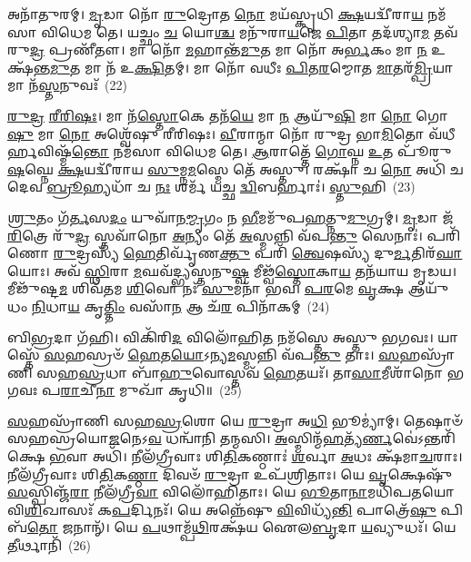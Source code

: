 𑌅𑌨𑌾᳴𑌤𑍁𑌰𑌮𑍍। \ul{𑌮𑍃}\-𑌡𑌾 𑌨𑍋᳴ \ul{𑌰𑍁}\-𑌦𑍍𑌰𑍋𑌤 \ul{𑌨𑍋} 𑌮𑌯᳴𑌸𑍍𑌕𑍃𑌧𑌿 \ul{𑌕𑍍𑌷}\-𑌯𑌦𑍍𑌵𑍀᳴𑌰𑌾\-\ul{𑌯} 𑌨𑌮᳴𑌸𑌾 𑌵𑌿𑌧𑍇𑌮 𑌤𑍇। 𑌯𑌚𑍍𑌛𑌂 \ul{𑌚} 𑌯𑍋\-\ul{𑌶𑍍𑌚} 𑌮𑌨𑍁᳴𑌰𑌾\-\ul{𑌯}\-𑌜𑍇 \ul{𑌪𑌿}\-𑌤𑌾 𑌤𑌦᳴𑌶𑍍𑌯𑌾\-\ul{𑌮} 𑌤𑌵᳴ 𑌰𑍁\-\ul{𑌦𑍍𑌰} 𑌪𑍍𑌰𑌣𑍀᳴𑌤𑍗। 𑌮𑌾 𑌨𑍋᳴ \ul{𑌮}\-𑌹𑌾𑌨𑍍𑌤᳴\-\ul{𑌮𑍁}\-𑌤 𑌮𑌾 𑌨𑍋᳴ 𑌅\-\ul{𑌰𑍍𑌭}\-𑌕𑌂 𑌮𑌾 \ul{𑌨} 𑌉𑌕𑍍𑌷᳴𑌨𑍍𑌤\-\ul{𑌮𑍁}\-𑌤 𑌮𑌾 𑌨᳴ 𑌉\-\ul{𑌕𑍍𑌷𑌿}\-𑌤𑌮𑍍। 𑌮𑌾 𑌨𑍋᳴ 𑌵𑌧𑍀𑌃 \ul{𑌪𑌿}\-𑌤\-\ul{𑌰}\-𑌮𑍍𑌮𑍋𑌤 \ul{𑌮𑌾}\-𑌤𑌰᳴\-\ul{𑌮𑍍𑌪𑍍𑌰𑌿}\-𑌯𑌾 𑌮𑌾 𑌨᳴\-\ul{𑌸𑍍𑌤}\-𑌨𑍁𑌵𑌃᳴~(22)

\-\ul{𑌰𑍁}\-\-\ul{𑌦𑍍𑌰} \ul{𑌰𑍀}\-\-\ul{𑌰𑌿}\-\-\ul{𑌷𑌃}\-। 𑌮𑌾 𑌨᳴\-\ul{𑌸𑍍𑌤𑍋}\-𑌕𑍇 𑌤𑌨᳴\-\ul{𑌯𑍇} 𑌮𑌾 \ul{𑌨} 𑌆𑌯𑍁᳴\-\ul{𑌷𑌿} 𑌮𑌾 \ul{𑌨𑍋} 𑌗𑍋\-\ul{𑌷𑍁} 𑌮𑌾 \ul{𑌨𑍋} 𑌅𑌶𑍍𑌵𑍇᳴𑌷𑍁 𑌰𑍀𑌰𑌿𑌷𑌃। \ul{𑌵𑍀}\-𑌰𑌾𑌨𑍍𑌮𑌾 𑌨𑍋᳴ 𑌰𑍁𑌦𑍍𑌰 𑌭𑌾\-\ul{𑌮𑌿}\-𑌤𑍋 𑌵᳴𑌧𑍀𑌰𑍍\mbox{}\-\ul{𑌹}\-𑌵𑌿𑌷𑍍𑌮᳴\-\ul{𑌨𑍍𑌤𑍋} 𑌨𑌮᳴𑌸𑌾 𑌵𑌿𑌧𑍇𑌮 𑌤𑍇। \ul{𑌆}\-𑌰𑌾𑌤𑍍𑌤𑍇᳴ \ul{𑌗𑍋}\-𑌘𑍍𑌨 \ul{𑌉}\-𑌤 𑌪𑍂᳴𑌰𑍁\-\ul{𑌷}\-𑌘𑍍𑌨𑍇 \ul{𑌕𑍍𑌷}\-𑌯𑌦𑍍𑌵𑍀᳴𑌰𑌾𑌯 \ul{𑌸𑍁}\-𑌮𑍍𑌨\-\ul{𑌮}\-𑌸𑍍𑌮𑍇 𑌤𑍇᳴ 𑌅𑌸𑍍𑌤𑍁। 𑌰𑌕𑍍𑌷𑌾᳴ 𑌚 \ul{𑌨𑍋} 𑌅𑌧𑌿᳴ 𑌚 𑌦𑍇𑌵 \ul{𑌬𑍍𑌰𑍂}\-𑌹𑍍𑌯𑌧𑌾᳴ 𑌚 \ul{𑌨𑌃} 𑌶𑌰𑍍𑌮᳴ 𑌯𑌚𑍍𑌛 \ul{𑌦𑍍𑌵𑌿}\-𑌬𑌰𑍍\mbox{}𑌹𑌾𑌃॑। \ul{𑌸𑍍𑌤𑍁}\-𑌹𑌿~(23)

\-\ul{𑌶𑍍𑌰𑍁}\-𑌤𑌂 𑌗᳴\-\ul{𑌰𑍍𑌤}\-𑌸\-\ul{𑌦𑌂} 𑌯𑍁𑌵𑌾᳴𑌨\-\ul{𑌮𑍍𑌮𑍃}\-𑌗𑌂 𑌨 \ul{𑌭𑍀}\-𑌮𑌮𑍁᳴𑌪\-\ul{𑌹}\-𑌤𑍍𑌨𑍁\-\ul{𑌮𑍁}\-𑌗𑍍𑌰𑌮𑍍। \ul{𑌮𑍃}\-𑌡𑌾 𑌜᳴\-\ul{𑌰𑌿}\-𑌤𑍍𑌰𑍇 𑌰𑍁᳴\-\ul{𑌦𑍍𑌰} 𑌸𑍍𑌤𑌵𑌾᳴𑌨𑍋 \ul{𑌅}\-𑌨𑍍𑌯𑌂 𑌤𑍇᳴ \ul{𑌅}\-𑌸𑍍𑌮𑌨𑍍𑌨𑌿 𑌵᳴𑌪\-\ul{𑌨𑍍𑌤𑍁} 𑌸𑍇𑌨𑌾𑌃॑। 𑌪𑌰𑌿᳴ 𑌣𑍋 \ul{𑌰𑍁}\-𑌦𑍍𑌰𑌸𑍍𑌯᳴ \ul{𑌹𑍇}\-𑌤𑌿𑌰𑍍𑌵𑍃᳴𑌣\-\ul{𑌕𑍍𑌤𑍁} 𑌪𑌰𑌿᳴ \ul{𑌤𑍍𑌵𑍇}\-𑌷𑌸𑍍𑌯᳴ 𑌦𑍁\-\ul{𑌰𑍍𑌮}\-𑌤𑌿𑌰᳴\-\ul{𑌘𑌾}\-𑌯𑍋𑌃। 𑌅𑌵᳴ \ul{𑌸𑍍𑌥𑌿}\-𑌰𑌾 \ul{𑌮}\-𑌘𑌵᳴𑌦𑍍𑌭𑍍𑌯𑌸𑍍𑌤𑌨𑍁\-\ul{𑌷𑍍𑌵} 𑌮𑍀𑌢𑍍𑌵᳴\-\ul{𑌸𑍍𑌤𑍋}\-𑌕𑌾\-\ul{𑌯} 𑌤𑌨᳴𑌯𑌾𑌯 𑌮𑍃𑌡𑌯। 𑌮𑍀𑌢𑍁᳴𑌷𑍍𑌟\-\ul{𑌮} 𑌶𑌿𑌵᳴𑌤𑌮 \ul{𑌶𑌿}\-𑌵𑍋 𑌨𑌃᳴ \ul{𑌸𑍁}\-𑌮𑌨𑌾᳴ 𑌭𑌵। \ul{𑌪}\-\-\ul{𑌰}\-𑌮𑍇 \ul{𑌵𑍃}\-𑌕𑍍𑌷 𑌆𑌯𑍁᳴𑌧𑌂 \ul{𑌨𑌿}\-𑌧𑌾\-\ul{𑌯} 𑌕𑍃\-\ul{𑌤𑍍𑌤𑌿𑌂} 𑌵𑌸𑌾᳴\-\ul{𑌨} 𑌆 𑌚᳴\-\ul{𑌰} 𑌪𑌿𑌨𑌾᳴𑌕𑌮𑍍~(24)

𑌬𑌿\-\ul{𑌭𑍍𑌰}\-𑌦𑌾 𑌗᳴𑌹𑌿। 𑌵𑌿𑌕𑌿᳴𑌰𑌿\-\ul{𑌦} 𑌵𑌿𑌲𑍋᳴𑌹𑌿\-\ul{𑌤} 𑌨𑌮᳴𑌸𑍍𑌤𑍇 𑌅𑌸𑍍𑌤𑍁 𑌭𑌗𑌵𑌃। 𑌯𑌾𑌸𑍍𑌤𑍇᳴ \ul{𑌸}\-𑌹𑌸𑍍𑌰𑍞᳴ \ul{𑌹𑍇}\-𑌤\-\ul{𑌯𑍋}\-\-𑌽𑌨𑍍𑌯\-\ul{𑌮}\-𑌸𑍍𑌮𑌨𑍍𑌨𑌿 𑌵᳴𑌪\-\ul{𑌨𑍍𑌤𑍁} 𑌤𑌾𑌃। \ul{𑌸}\-𑌹𑌸𑍍𑌰𑌾᳴𑌣𑌿 𑌸𑌹\-\ul{𑌸𑍍𑌰}\-𑌧𑌾 𑌬𑌾᳴\-\ul{𑌹𑍁}\-𑌵𑍋𑌸𑍍𑌤𑌵᳴ \ul{𑌹𑍇}\-𑌤𑌯𑌃᳴। 𑌤𑌾\-\ul{𑌸𑌾}\-𑌮𑍀𑌶𑌾᳴𑌨𑍋 𑌭𑌗𑌵𑌃 𑌪\-\ul{𑌰𑌾}\-𑌚𑍀\-\ul{𑌨𑌾} 𑌮𑍁𑌖𑌾᳴ 𑌕𑍃𑌧𑌿॥~(25)

{\anuvakamend[{\-\ul{𑌅}\-𑌸𑍍𑌮𑌿𑍟 \ul{𑌸𑍍𑌤}\-𑌨𑍁𑌵𑌃᳴ \ul{𑌸𑍍𑌤𑍁}\-𑌹𑌿 𑌪𑌿𑌨𑌾᳴\-\ul{𑌕}\-𑌮𑍇\-\ul{𑌕𑌾}\-𑌨𑍍𑌨\-\ul{𑌤𑍍𑌰𑌿}\-\-\ul{𑍞}\-𑌶𑌚𑍍𑌚᳴}]}%

\-\ul{𑌸}\-𑌹𑌸𑍍𑌰𑌾᳴𑌣𑌿 𑌸𑌹\-\ul{𑌸𑍍𑌰}\-𑌶𑍋 𑌯𑍇 \ul{𑌰𑍁}\-𑌦𑍍𑌰𑌾 𑌅\-\ul{𑌧𑌿} 𑌭𑍂𑌮𑍍𑌯𑌾॑𑌮𑍍। 𑌤𑍇𑌷𑌾𑍞᳴ 𑌸𑌹𑌸𑍍𑌰𑌯𑍋\-\ul{𑌜}\-𑌨𑍇\-𑌽\-\ul{𑌵} 𑌧𑌨𑍍𑌵𑌾᳴𑌨𑌿 𑌤𑌨𑍍𑌮𑌸𑌿। \ul{𑌅}\-𑌸𑍍𑌮𑌿𑌨𑍍𑌮᳴\-\ul{𑌹}\-𑌤𑍍𑌯᳴\-\ul{𑌰𑍍𑌣}\-𑌵𑍇॑\-𑌽\-𑌨𑍍𑌤𑌰𑌿᳴𑌕𑍍𑌷𑍇 \ul{𑌭}\-𑌵𑌾 𑌅𑌧𑌿᳴। 𑌨𑍀𑌲᳴𑌗𑍍𑌰𑍀𑌵𑌾𑌃 𑌶𑌿\-\ul{𑌤𑌿}\-𑌕𑌣𑍍𑌠𑌾𑌃॑ \ul{𑌶}\-𑌰𑍍𑌵𑌾 \ul{𑌅}\-𑌧𑌃 𑌕𑍍𑌷᳴𑌮𑌾\-\ul{𑌚}\-𑌰𑌾𑌃। 𑌨𑍀𑌲᳴𑌗𑍍𑌰𑍀𑌵𑌾𑌃 𑌶𑌿\-\ul{𑌤𑌿}\-𑌕\-\ul{𑌣𑍍𑌠𑌾} 𑌦𑌿𑌵𑍞᳴ \ul{𑌰𑍁}\-𑌦𑍍𑌰𑌾 𑌉𑌪᳴𑌶𑍍𑌰𑌿𑌤𑌾𑌃। 𑌯𑍇 \ul{𑌵𑍃}\-𑌕𑍍𑌷𑍇𑌷𑍁᳴ \ul{𑌸}\-𑌸𑍍𑌪𑌿𑌞𑍍𑌜᳴\-\ul{𑌰𑌾} 𑌨𑍀𑌲᳴𑌗𑍍𑌰𑍀\-\ul{𑌵𑌾} 𑌵𑌿𑌲𑍋᳴𑌹𑌿𑌤𑌾𑌃। 𑌯𑍇 \ul{𑌭𑍂}\-𑌤𑌾\-\ul{𑌨𑌾}\-𑌮𑌧𑌿᳴𑌪𑌤𑌯𑍋 𑌵𑌿\-\ul{𑌶𑌿}\-𑌖𑌾𑌸𑌃᳴ 𑌕\-\ul{𑌪}\-𑌰𑍍𑌦𑌿𑌨𑌃᳴। 𑌯𑍇 𑌅𑌨𑍍𑌨𑍇᳴𑌷𑍁 \ul{𑌵𑌿}\-𑌵𑌿𑌧𑍍𑌯᳴\-\ul{𑌨𑍍𑌤𑌿} 𑌪𑌾𑌤𑍍𑌰𑍇᳴\-\ul{𑌷𑍁} 𑌪𑌿𑌬᳴\-\ul{𑌤𑍋} 𑌜𑌨𑌾𑌨𑍍᳴। 𑌯𑍇 \ul{𑌪}\-𑌥𑌾𑌮𑍍𑌪᳴\-\ul{𑌥𑌿}\-𑌰𑌕𑍍𑌷᳴𑌯 𑌐𑌲\-\ul{𑌬𑍃}\-𑌦𑌾 \ul{𑌯}\-𑌵𑍍𑌯𑍁𑌧𑌃᳴। 𑌯𑍇 \ul{𑌤𑍀}\-𑌰𑍍𑌥𑌾𑌨𑌿᳴~(26)

